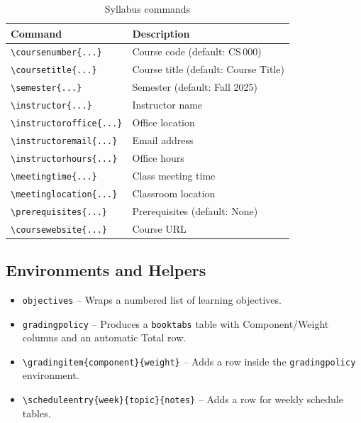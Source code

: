 \begin{table}[htbp]
    \centering
    \caption{Syllabus commands}
    \label{tab:syllabus-commands}
    \begin{tabular}{@{} l p{7.5cm} @{}}
        \toprule
        \textbf{Command} & \textbf{Description} \\
        \midrule
        \texttt{\textbackslash coursenumber\{...\}}    & Course code (default: CS\,000) \\
        \texttt{\textbackslash coursetitle\{...\}}     & Course title (default: Course Title) \\
        \texttt{\textbackslash semester\{...\}}        & Semester (default: Fall 2025) \\
        \texttt{\textbackslash instructor\{...\}}      & Instructor name \\
        \texttt{\textbackslash instructoroffice\{...\}} & Office location \\
        \texttt{\textbackslash instructoremail\{...\}}  & Email address \\
        \texttt{\textbackslash instructorhours\{...\}}  & Office hours \\
        \texttt{\textbackslash meetingtime\{...\}}      & Class meeting time \\
        \texttt{\textbackslash meetinglocation\{...\}}  & Classroom location \\
        \texttt{\textbackslash prerequisites\{...\}}    & Prerequisites (default: None) \\
        \texttt{\textbackslash coursewebsite\{...\}}    & Course URL \\
        \bottomrule
    \end{tabular}
\end{table}

\subsection{Environments and Helpers}

\begin{itemize}
    \item \texttt{objectives} -- Wraps a numbered list of learning objectives.
    \item \texttt{gradingpolicy} -- Produces a \texttt{booktabs} table with
          Component/Weight columns and an automatic Total row.
    \item \texttt{\textbackslash gradingitem\{component\}\{weight\}} --
          Adds a row inside the \texttt{gradingpolicy} environment.
    \item \texttt{\textbackslash scheduleentry\{week\}\{topic\}\{notes\}} --
          Adds a row for weekly schedule tables.
\end{itemize}

